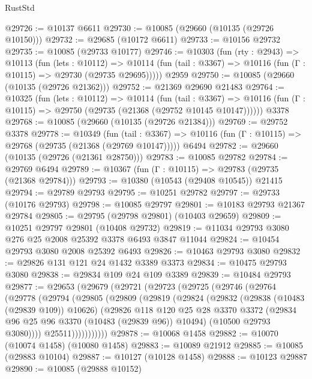 \begin{lexlean}{RustStd}
\begin{coremodule}
@29726 := @10137 @6611
@29730 := @10085 (@29660 (@10135 (@29726 @10150)))
@29732 := @29685 (@10172 @6611)
@29733 := @10156 @29732
@29735 := @10085 (@29733 @10177)
@29746 := @10303
    (fun (rty : @2943) =>
    @10113
      (fun (lets : @10112) =>
      @10114 (fun (tail : @3367) => @10116 (fun (Γ : @10115) => @29730 (@29735 @29695)))))
    @2959
@29750 := @10085 (@29660 (@10135 (@29726 @21362)))
@29752 := @21369 @29690 @21483
@29764 := @10325
    (fun (lets : @10112) =>
    @10114
      (fun (tail : @3367) =>
      @10116 (fun (Γ : @10115) => @29750 (@29735 (@21368 (@29752 @10145 @10147))))))
    @3378
@29768 := @10085 (@29660 (@10135 (@29726 @21384)))
@29769 := @29752 @3378
@29778 := @10349
    (fun (tail : @3367) => @10116 (fun (Γ : @10115) => @29768 (@29735 (@21368 (@29769 @10147)))))
    @6494
@29782 := @29660 (@10135 (@29726 (@21361 @28750)))
@29783 := @10085 @29782
@29784 := @29769 @6494
@29789 := @10367 (fun (Γ : @10115) => @29783 (@29735 (@21368 @29784)))
@29793 := @10380 (@10543 (@29408 @10545)) @21415
@29794 := @29789 @29793
@29795 := @10251 @29782
@29797 := @29733 (@10176 @29793)
@29798 := @10085 @29797
@29801 := @10183 @29793 @21367 @29784
@29805 := @29795 (@29798 @29801) (@10403 @29659)
@29809 := @10251 @29797 @29801 (@10408 @29732)
@29819 := @11034 @29793 @3080 @276 @25 @2008 @25392 @3378 @6493 @3847 @11044
@29824 := @10454 @29793 @3080 @2008 @25392 @6493
@29826 := @10463 @29793 @3080
@29832 := @29826 @131 @121 @24 @1432 @3389 @3373
@29834 := @10475 @29793 @3080
@29838 := @29834 @109 @24 @109 @3389
@29839 := @10484 @29793
@29877 := @29653
    (@29679
      (@29721
        (@29723
          (@29725
            (@29746
              (@29764
                (@29778
                  (@29794
                    (@29805
                      (@29809
                        (@29819
                          (@29824
                            (@29832
                              (@29838 (@10483 (@29839 @109)) @10626)
                              (@29826
                                @118
                                @120
                                @25
                                @28
                                @3370
                                @3372
                                (@29834 @96 @25 @96 @3370 (@10483 (@29839 @96)) @10494)
                                (@10500 @29793 @3080))))
                          @25511)))))))))))
@29878 := @10068 @1458
@29882 := @10070 (@10074 @1458) (@10080 @1458)
@29883 := @10089 @21912
@29885 := @10085 (@29883 @10104)
@29887 := @10127 (@10128 @1458)
@29888 := @10123 @29887
@29890 := @10085 (@29888 @10152)

\end{coremodule}
\end{lexlean}
